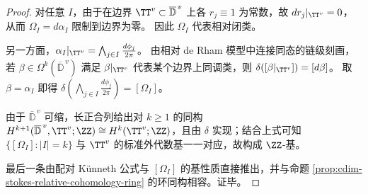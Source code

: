 \begin{proof}
对任意 \(I\)，由于在边界 \(\TT^{v}\subset \overline{\mathbb D}^{\,v}\) 上各 \(r_j\equiv 1\) 为常数，故 \(dr_j|_{\TT^{v}}=0\)，从而 \(\Omega_I=d\alpha_I\) 限制到边界为零。
因此 \(\Omega_I\) 代表相对闭类。
\par
另一方面，\(\alpha_I|_{\TT^{v}}=\bigwedge_{j\in I}\frac{d\phi_j}{2\pi}\)。
由相对 de Rham 模型中连接同态的链级刻画，若 \(\beta\in\Omega^{k}(\overline{\mathbb D}^{\,v})\) 满足 \(\beta|_{\TT^v}\) 代表某个边界上同调类，则 \(\delta([\beta|_{\TT^v}])=[d\beta]\)。
取 \(\beta=\alpha_I\) 即得 \(\delta(\bigwedge_{j\in I}\frac{d\phi_j}{2\pi})=[\Omega_I]\)。
\par
由于 \(\overline{\mathbb D}^{\,v}\) 可缩，长正合列给出对 \(k\ge 1\) 的同构
\(
H^{k+1}(\overline{\mathbb D}^{\,v},\TT^{v};\ZZ)\cong H^{k}(\TT^{v};\ZZ)
\)，且由 \(\delta\) 实现；结合上式可知 \(\{[\Omega_I]:|I|=k\}\) 与 \(\TT^{v}\) 的标准外代数基一一对应，故构成 \(\ZZ\)-基。
\par
最后一条由配对 Künneth 公式与 \([\Omega_I]\) 的基性质直接推出，并与命题 \ref{prop:cdim-stokes-relative-cohomology-ring} 的环同构相容。证毕。
\end{proof}


